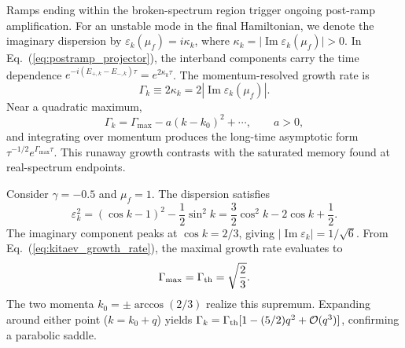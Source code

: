 \documentclass[aps,prb,reprint,superscriptaddress,amsmath,amssymb,floatfix]{revtex4-2}
\begin{document}
  Ramps ending within the broken-spectrum region trigger ongoing post-ramp amplification. For an unstable mode in the final Hamiltonian, we denote the imaginary dispersion by $\varepsilon_k(\mu_f)=i\kappa_k$, where $\kappa_k=\vert{}\operatorname{Im}\varepsilon_k(\mu_f)\vert{}>0$. In Eq.~(\ref{eq:postramp_projector}), the interband components carry the time dependence $e^{-i(E_{+,k}-E_{-,k})\tau}=e^{2\kappa_k\tau}$. The momentum-resolved growth rate is
\begin{equation}
\Gamma_k \equiv 2\kappa_k =2|\operatorname{Im}\varepsilon_k(\mu_f)|.
\label{eq:kitaev_growth_rate}
\end{equation}
Near a quadratic maximum,
\begin{equation}
\Gamma_k = \Gamma_{\max} -a(k-k_0)^2+\cdots, \qquad a>0,
\label{eq:kitaev_growth_saddle}
\end{equation}
and integrating over momentum produces the long-time asymptotic form $\tau^{-1/2}e^{\Gamma_{\max}\tau}$. This runaway growth contrasts with the saturated memory found at real-spectrum endpoints.

  Consider $\gamma=-0.5$ and $\mu_f=1$. The dispersion satisfies
\begin{equation}
\varepsilon_k^2 = (\cos k-1)^2-\frac12\sin^2k = \frac32\cos^2k-2\cos k+\frac12 .
\label{eq:eps2_muf1}
\end{equation}
The imaginary component peaks at $\cos k=2/3$, giving $\vert{}\operatorname{Im}\varepsilon_k\vert{}=1/\sqrt6$. From Eq.~(\ref{eq:kitaev_growth_rate}), the maximal growth rate evaluates to
\begin{equation}
\Gamma_{\max} = \Gamma_{\rm th} = \sqrt{\frac{2}{3}}.
\label{eq:Gamma_th}
\end{equation}
The two momenta $k_0=\pm\arccos(2/3)$ realize this supremum. Expanding around either point ($k=k_0+q$) yields $\Gamma_k=\Gamma_{\rm th}[1-(5/2)q^2+\mathcal O(q^3)]$, confirming a parabolic saddle.
\end{document}
